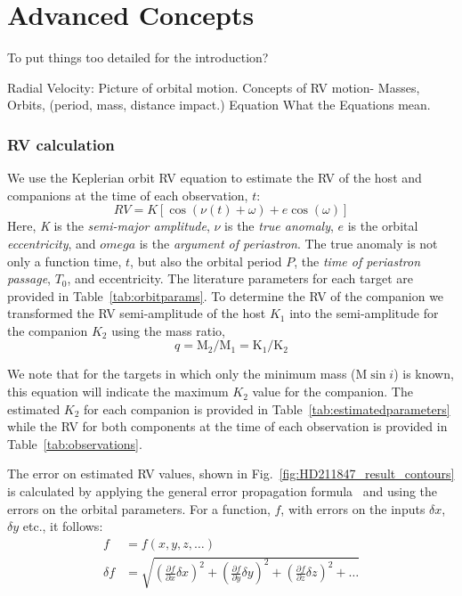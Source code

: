 
\chapter{Advanced Concepts}
\label{cha:concepts}
To put things too detailed for the introduction?


Radial Velocity:
Picture of orbital motion.
Concepts of {RV} motion-
Masses,
Orbits, (period, mass, distance impact.)
Equation
What the Equations mean.

\subsection{{RV} calculation}
We use the Keplerian orbit {RV} equation to estimate the {RV} of the host and companions at the time of each observation, \(t\):
\begin{equation}
\label{eq:rv_equation}
{RV} = K [\cos{(\nu(t) + \omega)} + e\cos{(\omega)}]
\end{equation}
Here, \emph{K} is the \emph{semi-major amplitude}, \(\nu\) is the \emph{true anomaly}, \(e\) is the orbital \emph{eccentricity}, and \(omega\) is the \emph{argument of periastron}. The true anomaly is not only a function time, \(t\), but also the orbital period \(P\),  the \emph{time of periastron passage}, \(T_0\), and eccentricity. The literature parameters for each target are provided in Table~\ref{tab:orbitparams}.
To determine the {RV} of the companion we transformed the {RV} semi-amplitude of the host \(K_{1} \) into the semi-amplitude for the companion \(K_{2} \) using the mass ratio,
\begin{equation}
\label{eqn:mass_ratio}
q = \textrm{M}_{2} / \textrm{M}_{1} = \textrm{K}_{1} / \textrm{K}_{2}
\end{equation}

We note that for the targets in which only the minimum mass (\(\textrm{M}\sin{i} \)) is known, this equation will indicate the maximum \(K_2\) value for the companion. The estimated \(K_2\) for each companion is provided in Table~\ref{tab:estimatedparameters} while the {RV} for both components at the time of each observation is provided in Table~\ref{tab:observations}.

The error on estimated {RV} values, shown in Fig.~\ref{fig:HD211847_result_contours} is calculated by applying the general error propagation formula~\citep{ku_notes_1966} and using the  errors on the orbital parameters. For a function, \(f\), with errors on the inputs \(\delta x\), \(\delta y\) etc., it follows:
\begin{align}
f &= f(x, y, z, \ldots)\\
\delta f &= \sqrt{{\left( \frac{\partial f}{\partial x} \delta x\right)}^2 + {\left(\frac{\partial f}{\partial y} \delta y\right)}^2 + {\left(\frac{\partial f}{\partial z} \delta z\right)}^2 + \ldots}
\end{align}




